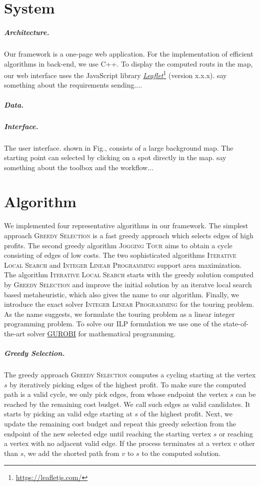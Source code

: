 \documentclass[sigconf,natbib=false]{acmart}
\newcommand{\greedy}{\textsc{Greedy Selection}\xspace}
\newcommand{\jogging}{\textsc{Jogging Tour}\xspace}
\newcommand{\ils}{\textsc{Iterative Local Search}\xspace}
\newcommand{\ilp}{\textsc{Integer Linear Programming}\xspace}
\begin{document}
\section{System}
\label{sec:system}
\subparagraph*{\textbf{Architecture.}}
Our framework is a one-page web application. For the implementation of efficient algorithms in back-end, we use C++. To display the computed routs in the map, our web interface uses the JavaScript library \href{https://leafletjs.com/}{\emph{Leaflet}}\footnote{\url{https://leafletjs.com/}} 
(version x.x.x). say something about the requirements sending....
\subparagraph*{\textbf{Data.}}

\subparagraph*{\textbf{Interface.}}
The user interface. shown in Fig., consists of a large background map. The starting point can selected by clicking on a spot directly in the map. 
say something about the toolbox and the workflow... 
\section{Algorithm}
\label{sec:algo}
We implemented four representative algorithms in our framework. The simplest approach \greedy is a fast greedy approach which selects edges of high profits.
The second greedy algorithm \jogging aims to obtain a cycle consisting of edges of low costs.  
The two sophisticated algorithms \ils and \ilp support area maximization. 
The algorithm \ils starts with the greedy solution computed by \greedy and improve the initial solution by an iteratve local search based metaheuristic, which also gives the name to our algorithm.
Finally, we introduce the exact solver \ilp for  the touring problem. As the name suggests, we formulate the touring problem as a  linear integer programming problem. 	
To solve our ILP formulation we use one of the state-of-the-art solver \href{https://www.gurobi.com/}{GUROBI} for mathematical programming. %
     
\subparagraph*{\textbf{Greedy Selection.}}
The greedy approach \greedy computes a cycling starting at the vertex $s$ by iteratively picking edges of the highest profit. To make sure the computed path is a valid cycle, we only pick edges, from whose endpoint the vertex $s$ can be reached by the remaining cost budget. We call such edges as valid candidates. 
It starts by picking an valid edge starting at $s$ of the highest profit. 
Next, we update the remaining cost budget and repeat this greedy selection from the endpoint of the new selected edge until reaching the starting vertex $s$ or reaching a vertex with no adjacent valid edge. 
If the process terminates at a vertex $v$ other than $s$, we add the shorted path from $v$ to $s$ to the computed solution. 
        
\end{document}
